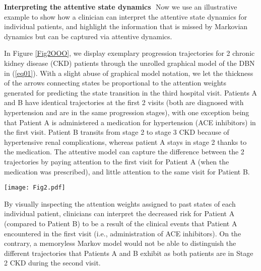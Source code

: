\documentclass[twoside,11pt]{article}
\begin{document}
{\bf Interpreting the attentive state dynamics}\,\, Now we use an illustrative example to show how a clinician can interpret the attentive state dynamics for individual patients, and highlight the information that is missed by Markovian dynamics but can be captured via attentive dynamics.  

\begin{minipage}{0.515\textwidth}
In Figure \ref{Fig2OOO}, we display exemplary progression trajectories for 2 chronic kidney disease (CKD) patients through the unrolled graphical model of the DBN in (\ref{eq01}). With a slight abuse of graphical model notation, we let the thickness of the arrows connecting states be proportional to the attention weights generated for predicting the state transition in the third hospital visit. Patients A and B have identical trajectories at the first 2 visits (both are diagnosed with hypertension and are in the same progression stages), with one exception being that Patient A is administered a medication for hypertension (ACE inhibitors) in the first visit. Patient B transits from stage 2 to stage 3 CKD because of hypertensive renal complications, whereas patient A stays in stage 2 thanks to the medication. The attentive model can capture the difference between the 2 trajectories by paying attention to the first visit for Patient A (when the medication was prescribed), and little attention to the same visit for Patient B.   
\end{minipage}
\hfill
\begin{minipage}[h]{0.475\textwidth}
  \centering
  \texttt{[image: Fig2.pdf]}
	\label{Fig2OOO}
\end{minipage} 

By visually inspecting the attention weights assigned to past states of each individual patient, clinicians can interpret the decreased risk for Patient A (compared to Patient B) to be a result of the clinical events that Patient A encountered in the first visit (i.e., administration of ACE inhibitors). On the contrary, a memoryless Markov model would not be able to distinguish the different trajectories that Patients A and B exhibit as both patients are in Stage 2 CKD during the second visit. 

\newpage
\nocite{*}

\end{document}
